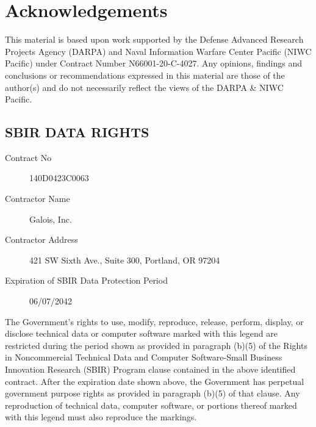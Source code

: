\section{Acknowledgements}

This material is based upon work supported by the Defense Advanced Research Projects Agency (DARPA) and Naval Information Warfare Center Pacific (NIWC Pacific) under Contract Number N66001-20-C-4027.
Any opinions, findings and conclusions or recommendations expressed in this material are those of the author(s) and do not necessarily reflect the views of the DARPA \& NIWC Pacific.

\subsection*{SBIR DATA RIGHTS}

\begin{description}
\item[Contract No] 140D0423C0063
\item[Contractor Name] Galois, Inc.
\item[Contractor Address] 421 SW Sixth Ave., Suite 300, Portland, OR 97204
\item[Expiration of SBIR Data Protection Period] 06/07/2042
\end{description}

The Government's rights to use, modify, reproduce, release, perform, display, or disclose technical data or computer software marked with this legend are restricted during the period shown as provided in paragraph (b)(5) of the Rights in Noncommercial Technical Data and Computer Software-Small Business Innovation Research (SBIR) Program clause contained in the above identified contract.
After the expiration date shown above, the Government has perpetual government purpose rights as provided in paragraph (b)(5) of that clause.
Any reproduction of technical data, computer software, or portions thereof marked with this legend must also reproduce the markings.

